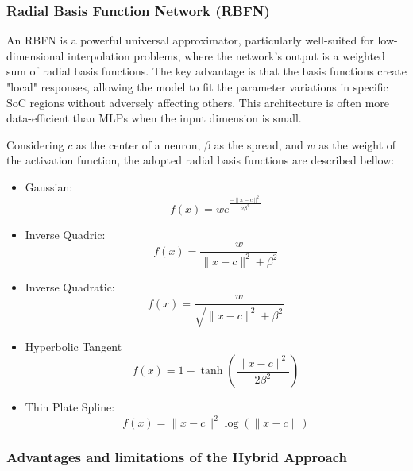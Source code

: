 \documentclass[lettersize,journal]{IEEEtran}
\begin{document}
\subsubsection{Radial Basis Function Network (RBFN)}

An RBFN is a powerful universal approximator, particularly well-suited for low-dimensional interpolation problems\cite{broomhead1988radial}, where the network's output is a weighted sum of radial basis functions. The key advantage is that the basis functions create "local" responses, allowing the model to fit the parameter variations in specific SoC regions without adversely affecting others. This architecture is often more data-efficient than MLPs when the input dimension is small\cite{broomhead1988radial}.

Considering $c$ as the center of a neuron, $\beta$ as the spread, and $w$ as the weight of the activation function, the adopted radial basis functions are described bellow:
\begin{itemize}
	\item Gaussian:
	\begin{equation}
		f(x)=we^{\frac{-\|x-c\|^2}{2\beta^2}}
	\end{equation}
	\item Inverse Quadric:
	\begin{equation}
		f(x) = \frac{w}{\|x-c\|^2+\beta^2}
	\end{equation}
	\item Inverse Quadratic:
	\begin{equation}
		f(x) = \frac{w}{\sqrt{\|x-c\|^2+\beta^2}}
	\end{equation}
	\item Hyperbolic Tangent
	\begin{equation}
		f(x) = 1-\tanh\left(\frac{\|x-c\|^2}{2\beta^2}\right)
	\end{equation}
	\item Thin Plate Spline:
	\begin{equation}
		f(x) = \|x-c\|^2\log\left(\|x-c\|\right)
	\end{equation}
\end{itemize}

\subsubsection{Advantages and limitations of the Hybrid Approach}
\end{document}
